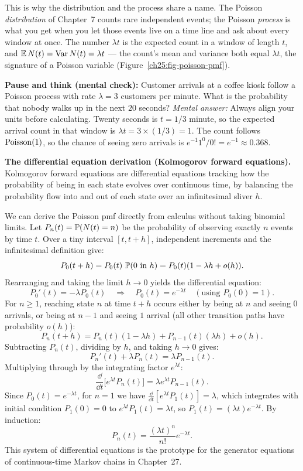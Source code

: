 This is why the distribution and the process share a name. The Poisson
\emph{distribution} of Chapter~7 counts rare independent events; the Poisson
\emph{process} is what you get when you let those events live on a time line and
ask about every window at once. The number $\lambda t$ is the expected count in a
window of length $t$, and $\E N(t) = \Var N(t) = \lambda t$ --- the count's mean
and variance both equal $\lambda t$, the signature of a Poisson variable
(Figure~\ref{ch25:fig-poisson-pmf}).

\begin{walkbox}
\textbf{Pause and think (mental check):} Customer arrivals at a coffee kiosk follow
a Poisson process with rate $\lambda = 3$ customers per minute. What is the
probability that nobody walks up in the next $20$ seconds?
\emph{Mental answer:} Always align your units before calculating. Twenty seconds is
$t = 1/3$ minute, so the expected arrival count in that window is $\lambda t = 3 \times
(1/3) = 1$. The count follows $\Pois(1)$, so the chance of seeing zero arrivals is
$e^{-1} 1^0 / 0! = e^{-1} \approx 0.368$.
\end{walkbox}

\begin{formalbox}
\textbf{The differential equation derivation (Kolmogorov forward equations).}
Kolmogorov forward equations are differential equations tracking how the probability of being in each state evolves over continuous time, by balancing the probability flow into and out of each state over an infinitesimal sliver $h$.

We can derive the Poisson pmf directly from calculus without taking binomial limits. Let $P_n(t) = \P(N(t) = n)$ be the probability of observing exactly $n$ events by time $t$. Over a tiny interval $[t, t+h]$, independent increments and the infinitesimal definition give:
\[
  P_0(t+h) = P_0(t)\,\P(0 \text{ in } h) = P_0(t)(1 - \lambda h + o(h)).
\]
Rearranging and taking the limit $h \to 0$ yields the differential equation:
\[
  P_0'(t) = -\lambda P_0(t) \quad \Longrightarrow \quad P_0(t) = e^{-\lambda t} \quad (\text{using } P_0(0) = 1).
\]
For $n \ge 1$, reaching state $n$ at time $t+h$ occurs either by being at $n$ and seeing $0$ arrivals, or being at $n-1$ and seeing $1$ arrival (all other transition paths have probability $o(h)$):
\[
  P_n(t+h) = P_n(t)(1 - \lambda h) + P_{n-1}(t)(\lambda h) + o(h).
\]
Subtracting $P_n(t)$, dividing by $h$, and taking $h \to 0$ gives:
\[
  P_n'(t) + \lambda P_n(t) = \lambda P_{n-1}(t).
\]
Multiplying through by the integrating factor $e^{\lambda t}$:
\[
  \frac{\dd}{\dd t}\big[ e^{\lambda t} P_n(t) \big] = \lambda e^{\lambda t} P_{n-1}(t).
\]
Since $P_0(t) = e^{-\lambda t}$, for $n=1$ we have $\frac{\dd}{\dd t}[e^{\lambda t} P_1(t)] = \lambda$, which integrates with initial condition $P_1(0) = 0$ to $e^{\lambda t} P_1(t) = \lambda t$, so $P_1(t) = (\lambda t) e^{-\lambda t}$. By induction:
\[
  P_n(t) = \frac{(\lambda t)^n}{n!} e^{-\lambda t}.
\]
This system of differential equations is the prototype for the generator equations of continuous-time Markov chains in Chapter~27.
\end{formalbox}

